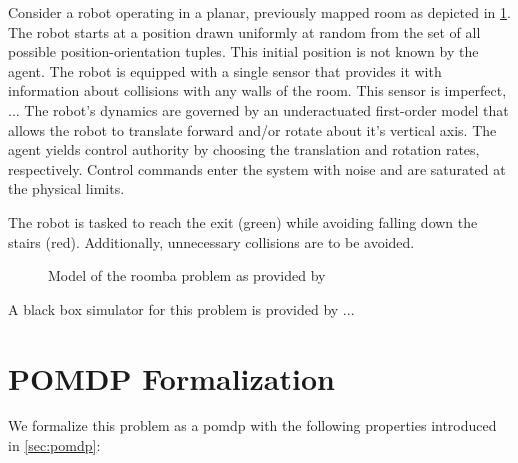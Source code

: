 
Consider a robot operating in a planar, previously mapped room as depicted in
\cref{fig:roomba-env}. The robot starts at a position drawn uniformly at random
from the set of all possible position-orientation tuples. This initial position
is not known by the agent. The robot is equipped with a single sensor that
provides it with information about collisions with any walls of the room. This
sensor is imperfect, ...  The
robot's dynamics are governed by an underactuated first-order model that allows
the robot to translate forward and/or rotate about it's vertical axis. The
agent yields control authority by choosing the
translation and rotation rates, respectively. Control commands enter the system
with noise and are saturated at the physical limits.

The robot is tasked to reach the exit (green) while avoiding falling down the
stairs (red). Additionally, unnecessary collisions are to be avoided.

\begin{figure}[htpb]
  \centering
  \caption{Model of the roomba problem as provided by }
  \label{fig:roomba-env}
\end{figure}

A black box simulator for this problem is provided by ...

\section{POMDP Formalization}\label{sec:lp-pomdp-formalization}

We formalize this problem as a \ac{pomdp} with the following properties introduced in \cref{sec:pomdp}:

